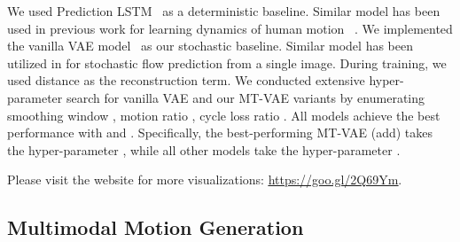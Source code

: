 \documentclass[runningheads]{llncs}
\newcommand{\cutsubsectionup}{\vspace*{-0.1in}}
\newcommand{\cutsubsectiondown}{\vspace*{-0.07in}}
\begin{document}
We used Prediction LSTM~\cite{villegas2017learning} as a deterministic baseline. Similar model has been used in previous work for learning dynamics of human motion ~\cite{fragkiadaki2015recurrent,chao2017forecasting}.
We implemented the vanilla VAE model~\cite{mohammad2018stochastic} as our stochastic baseline. 
Similar model has been utilized in \cite{xue2016visual,walker2016uncertain,walker2017pose} for stochastic flow prediction from a single image.
During training, we used  distance as the reconstruction term. We conducted extensive hyper-parameter search for vanilla VAE and our MT-VAE variants by enumerating smoothing window , motion ratio , cycle loss ratio .
All models achieve the best performance with  and .
Specifically, the best-performing MT-VAE (add) takes the hyper-parameter , while all other models take the hyper-parameter . 


Please visit the website for more visualizations: {\color{blue}\underline{\href{https://goo.gl/2Q69Ym}{https://goo.gl/2Q69Ym}}}.


\cutsubsectionup
\subsection{Multimodal Motion Generation}
\label{sec:exp_seqgen}
\cutsubsectiondown
\end{document}

